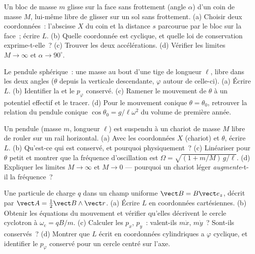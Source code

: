 \begin{exercise}[$\star\star$]\label{exo:b3:lagrangian-mechanics:5}
Un bloc de masse $m$ glisse sur la face sans frottement (angle
$\alpha$) d'un coin de masse $M$, lui-même libre de glisser sur un sol
sans frottement. (a) Choisir deux coordonnées~: l'abscisse $X$ du
coin et la distance $s$ parcourue par le bloc sur la face~; écrire
$L$. (b) Quelle coordonnée est cyclique, et quelle loi de conservation
exprime-t-elle~? (c) Trouver les deux accélérations. (d) Vérifier les
limites $M \to \infty$ et $\alpha \to
90^\circ$.
\end{exercise}

\begin{exercise}[$\star\star$]\label{exo:b3:lagrangian-mechanics:6}
Le pendule sphérique~: une masse au bout d'une tige de longueur $\ell$,
libre dans les deux angles ($\theta$ depuis la verticale descendante,
$\varphi$ autour de celle-ci). (a) Écrire $L$. (b) Identifier la
 et le $p_\varphi$ conservé. (c) Ramener le
mouvement de $\theta$ à un potentiel effectif et le tracer. (d) Pour le
mouvement conique $\theta =
\theta_0$, retrouver la relation du pendule conique $\cos\theta_0 =
g/\ell\omega^2$ du volume de première année.
\end{exercise}

\begin{exercise}[$\star\star$]\label{exo:b3:lagrangian-mechanics:7}
Un pendule (masse $m$, longueur $\ell$) est suspendu à un chariot de
masse $M$ libre de rouler sur un rail horizontal. (a) Avec les
coordonnées $X$ (chariot) et $\theta$, écrire $L$. (b) Qu'est-ce qui
est conservé, et pourquoi physiquement~? (c) Linéariser pour $\theta$
petit et montrer que la fréquence d'oscillation est
$\Omega = \sqrt{(1 + m/M)\,g/\ell}$. (d) Expliquer les limites $M \to
\infty$ et $M \to 0$ --- pourquoi un chariot léger \emph{augmente}-t-il
la fréquence~?
\end{exercise}

\begin{exercise}[$\star\star$]\label{exo:b3:lagrangian-mechanics:8}
Une particule de charge $q$ dans un champ uniforme $\vect B = B\vect e_z$,
décrit par $\vect A = \tfrac12\vect B\wedge\vect r$. (a) Écrire $L$ en
coordonnées cartésiennes. (b) Obtenir les équations du mouvement et
vérifier qu'elles décrivent le cercle cyclotron à
$\omega_{\text{c}} = qB/m$. (c) Calculer les  $p_x$,
$p_y$~: valent-ils $m\dot x$, $m\dot y$~? Sont-ils conservés~? (d)
Montrer que $L$ écrit en coordonnées cylindriques a $\varphi$ cyclique,
et identifier le $p_\varphi$ conservé pour un cercle centré sur l'axe.
\end{exercise}

